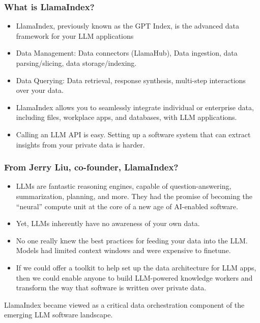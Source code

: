 \begin{frame}[fragile]\frametitle{What is LlamaIndex?}

\begin{itemize}
\item LlamaIndex, previously known as the GPT Index, is the advanced data framework for your LLM applications
\item Data Management: Data connectors (LlamaHub), Data ingestion, data parsing/slicing, data storage/indexing.
\item Data Querying: Data retrieval, response synthesis, multi-step interactions over your data.
\item LlamaIndex allows you to seamlessly integrate individual or enterprise data, including files, workplace apps, and databases, with LLM applications. 
\item Calling an LLM API is easy. Setting up a software system that can extract insights from your private data is harder.
\end{itemize}	

\end{frame}





\begin{frame}[fragile]\frametitle{From Jerry Liu, co-founder, LlamaIndex?}

\begin{itemize}
\item LLMs are fantastic reasoning engines, capable of question-answering, summarization, planning, and more. They had the promise of becoming the “neural” compute unit at the core of a new age of AI-enabled software.
\item Yet, LLMs inherently have no awareness of your own data.
\item No one really knew the best practices for feeding your data into the LLM. Models had limited context windows and were expensive to finetune.
\item If we could offer a toolkit to help set up the data architecture for LLM apps, then we could enable anyone to build LLM-powered knowledge workers and transform the way that software is written over private data.
\end{itemize}	

LlamaIndex became viewed as a critical data orchestration component of the emerging LLM software landscape.

\end{frame}

